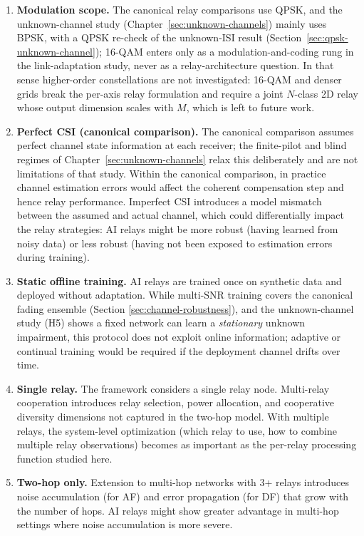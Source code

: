 \begin{enumerate}
\def\labelenumi{\arabic{enumi}.}
\item
  \textbf{Modulation scope.} The canonical relay comparisons use QPSK, and the unknown-channel study (Chapter~\ref{sec:unknown-channels}) mainly uses BPSK, with a QPSK re-check of the unknown-ISI result (Section~\ref{sec:qpsk-unknown-channel}); 16-QAM enters only as a modulation-and-coding rung in the link-adaptation study, never as a relay-architecture question. In that sense higher-order constellations are not investigated: 16-QAM and denser grids break the per-axis relay formulation and require a joint $N$-class 2D relay whose output dimension scales with $M$, which is left to future work.
\item
  \textbf{Perfect CSI (canonical comparison).} The canonical comparison assumes perfect channel state information at each receiver; the finite-pilot and blind regimes of Chapter~\ref{sec:unknown-channels} relax this deliberately and are not limitations of that study. Within the canonical comparison, in practice channel estimation errors would affect the coherent compensation step and hence relay performance. Imperfect CSI introduces a model mismatch between the assumed and actual channel, which could differentially impact the relay strategies: AI relays might be more robust (having learned from noisy data) or less robust (having not been exposed to estimation errors during training).
\item
  \textbf{Static offline training.} AI relays are trained once on synthetic data and deployed without adaptation. While multi-SNR training covers the canonical fading ensemble (Section \ref{sec:channel-robustness}), and the unknown-channel study (H5) shows a fixed network can learn a \emph{stationary} unknown impairment, this protocol does not exploit online information; adaptive or continual training would be required if the deployment channel drifts over time.
\item
  \textbf{Single relay.} The framework considers a single relay node. Multi-relay cooperation introduces relay selection, power allocation, and cooperative diversity dimensions not captured in the two-hop model. With multiple relays, the system-level optimization (which relay to use, how to combine multiple relay observations) becomes as important as the per-relay processing function studied here.
\item
  \textbf{Two-hop only.} Extension to multi-hop networks with 3+ relays introduces noise accumulation (for AF) and error propagation (for DF) that grow with the number of hops. AI relays might show greater advantage in multi-hop settings where noise accumulation is more severe.

\end{enumerate}
